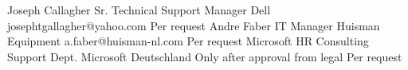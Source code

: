%
%
%


\begin{referees}
		{Joseph Callagher}
		{Sr. Technical Support Manager}
		{Dell}
		{josephtgallagher@yahoo.com}
		{Per request}
		{Andre Faber}
		{IT Manager}
		{Huisman Equipment}
		{a.faber@huisman-nl.com}
		{Per request}
		{Microsoft HR Consulting}
		{Support Dept.}
		{Microsoft Deutschland}
		{Only after approval from legal}
		{Per request}
		
\end{referees}
